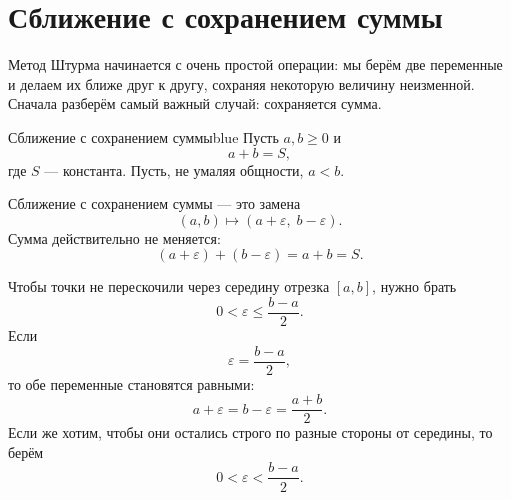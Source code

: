 \tableofcontents



\chapter{Сближение с сохранением суммы}

Метод Штурма начинается с очень простой операции: мы берём две переменные и
делаем их ближе друг к другу, сохраняя некоторую величину неизменной.
Сначала разберём самый важный случай: сохраняется сумма.

\begin{taskbox}{Сближение с сохранением суммы}{blue}{}
Пусть $a,b\ge 0$ и
\[
    a+b=S,
\]
где $S$ --- константа. Пусть, не умаляя общности, $a<b$.

Сближение с сохранением суммы --- это замена
\[
    (a,b)\longmapsto (a+\varepsilon,\; b-\varepsilon).
\]
Сумма действительно не меняется:
\[
    (a+\varepsilon)+(b-\varepsilon)=a+b=S.
\]

Чтобы точки не перескочили через середину отрезка $[a,b]$, нужно брать
\[
    0<\varepsilon\le \frac{b-a}{2}.
\]
Если
\[
    \varepsilon=\frac{b-a}{2},
\]
то обе переменные становятся равными:
\[
    a+\varepsilon=b-\varepsilon=\frac{a+b}{2}.
\]
Если же хотим, чтобы они остались строго по разные стороны от середины, то
берём
\[
    0<\varepsilon<\frac{b-a}{2}.
\]
\end{taskbox}

